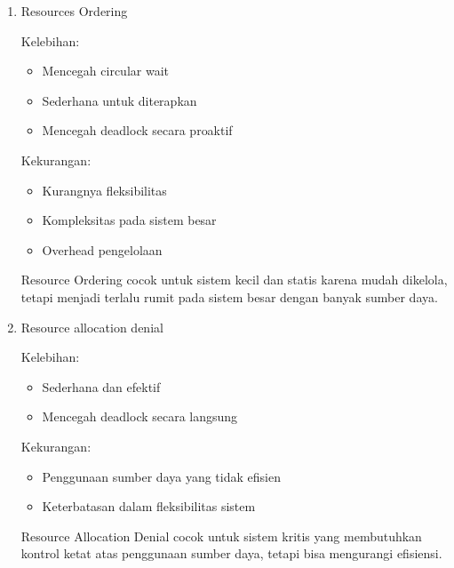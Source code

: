 \documentclass[12pt]{article}
\begin{document}
\begin{enumerate}
    \item Resources Ordering

            \hspace{0cm} Kelebihan:
            \begin{itemize}
              \item Mencegah circular wait
              \item Sederhana untuk diterapkan
              \item Mencegah deadlock secara proaktif
            \end{itemize}


            \hspace{0cm} Kekurangan:
            \begin{itemize}
              \item Kurangnya fleksibilitas
              \item Kompleksitas pada sistem besar
              \item Overhead pengelolaan
            \end{itemize}

          \hspace{1cm}Resource Ordering cocok untuk sistem kecil dan statis karena mudah dikelola, tetapi menjadi terlalu rumit pada sistem besar dengan banyak sumber daya.

    \item Resource allocation denial

          \hspace{0cm} Kelebihan:
            \begin{itemize}
              \item Sederhana dan efektif
              \item Mencegah deadlock secara langsung
            \end{itemize}


            \hspace{0cm} Kekurangan:
            \begin{itemize}
              \item Penggunaan sumber daya yang tidak efisien
              \item Keterbatasan dalam fleksibilitas sistem
            \end{itemize}

        \hspace{1cm}Resource Allocation Denial cocok untuk sistem kritis yang membutuhkan kontrol ketat atas penggunaan sumber daya, tetapi bisa mengurangi efisiensi.


\end{enumerate}
\end{document}
